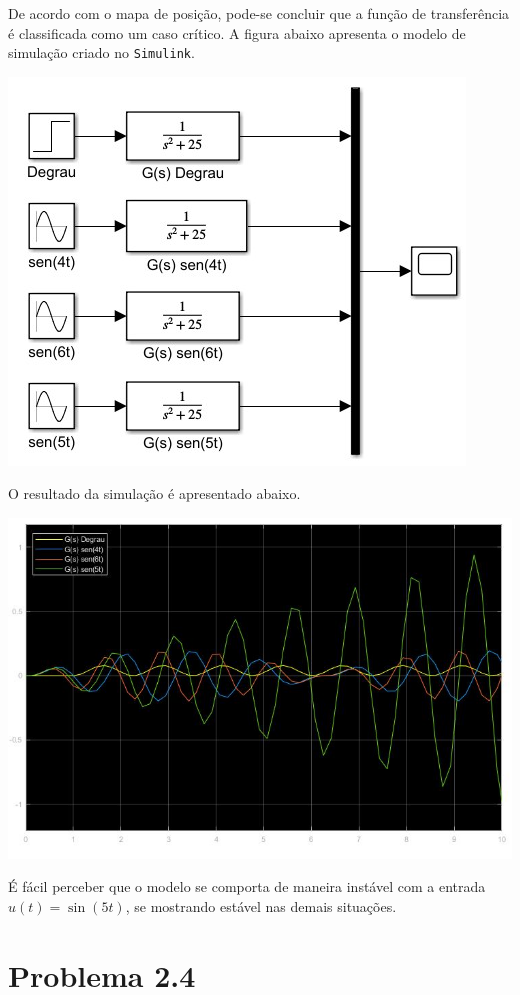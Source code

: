 \documentclass[
]{book}
\theoremstyle{definition}
\theoremstyle{definition}
\theoremstyle{definition}
\theoremstyle{remark}
\begin{document}
De acordo com o mapa de posição, pode-se concluir que a função de transferência é classificada como um caso crítico. A figura abaixo apresenta o modelo de simulação criado no \texttt{Simulink}.

\includegraphics{Imagens/Lab2/modelSim3.jpg}

O resultado da simulação é apresentado abaixo.

\includegraphics{Imagens/Lab2/prob3Sim.jpg}

É fácil perceber que o modelo se comporta de maneira instável com a entrada \(u(t) = \sin(5t)\), se mostrando estável nas demais situações.

\hypertarget{problema-2.4}{%
\section*{Problema 2.4}\label{problema-2.4}}
\end{document}
